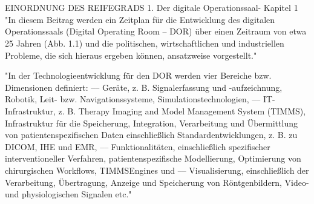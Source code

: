 \chapter{}
\label{sec:overview}


EINORDNUNG DES REIFEGRADS
1. Der digitale Operationssaal- Kapitel 1
	"In diesem Beitrag werden ein Zeitplan für die Entwicklung
	des digitalen Operationssaals (Digital Operating Room – DOR) über einen Zeitraum
	von etwa 25 Jahren (Abb. 1.1) und die politischen, wirtschaftlichen und industriellen
	Probleme, die sich hieraus ergeben können, ansatzweise vorgestellt."
	
	"In der Technologieentwicklung für den DOR werden vier Bereiche bzw. Dimensionen
	definiert:
	–– Geräte, z. B. Signalerfassung und -aufzeichnung, Robotik, Leit- bzw. Navigationssysteme,
	Simulationstechnologien,
	–– IT-Infrastruktur, z. B. Therapy Imaging and Model Management System (TIMMS),
	Infrastruktur für die Speicherung, Integration, Verarbeitung und Übermittlung
	von patientenspezifischen Daten einschließlich Standardentwicklungen, z. B. zu
	DICOM, IHE und EMR,
	–– Funktionalitäten, einschließlich spezifischer interventioneller Verfahren, patientenspezifische
	Modellierung, Optimierung von chirurgischen Workflows, TIMMSEngines
	und
	–– Visualisierung, einschließlich der Verarbeitung, Übertragung, Anzeige und Speicherung
	von Röntgenbildern, Video- und physiologischen Signalen etc."
	

